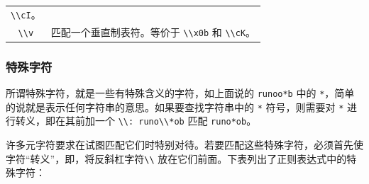 \documentclass[doctor,openright,twoside]{sjtuthesis}
\newcommand{\passthrough}[1]{#1}
\theoremstyle{plain}
\theoremstyle{definition}
\theoremstyle{remark}
\theoremstyle{ocrenumbox}
\theoremstyle{plain}
\begin{document}
\begin{longtable}[]{@{}cl@{}}
\begin{minipage}[t]{0.72\columnwidth}
\passthrough{\lstinline!\\cI!}。\strut
\end{minipage}\tabularnewline
\begin{minipage}[t]{0.23\columnwidth}\centering
\passthrough{\lstinline!\\v!}\strut
\end{minipage} & \begin{minipage}[t]{0.72\columnwidth}\raggedright
匹配一个垂直制表符。等价于 \passthrough{\lstinline!\\x0b!} 和
\passthrough{\lstinline!\\cK!}。\strut
\end{minipage}\tabularnewline
\bottomrule
\end{longtable}

\subsubsection{特殊字符}

所谓特殊字符，就是一些有特殊含义的字符，如上面说的
\passthrough{\lstinline!runoo*b!} 中的
\passthrough{\lstinline!*!}，简单的说就是表示任何字符串的意思。如果要查找字符串中的
\passthrough{\lstinline!*!} 符号，则需要对 \passthrough{\lstinline!*!}
进行转义，即在其前加一个 \passthrough{\lstinline!\\: runo\\*ob!} 匹配
\passthrough{\lstinline!runo*ob!}。

许多元字符要求在试图匹配它们时特别对待。若要匹配这些特殊字符，必须首先使字符``转义''，即，将反斜杠字符\passthrough{\lstinline!\\!}
放在它们前面。下表列出了正则表达式中的特殊字符：
\end{document}
